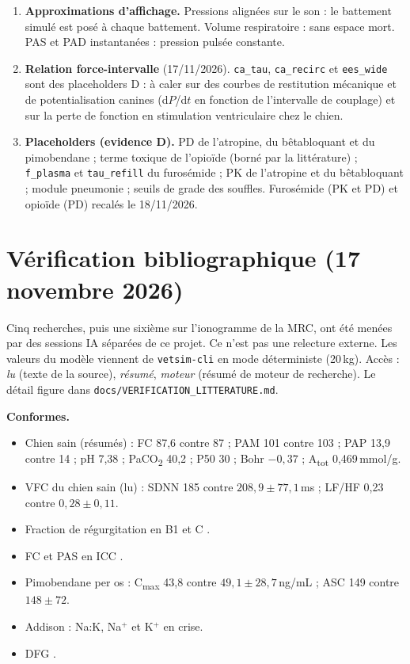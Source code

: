\documentclass[11pt,a4paper]{article}
\begin{document}
\begin{enumerate}
  \item \textbf{Approximations d'affichage.} Pressions alignées sur le son : le battement simulé est posé à chaque battement. Volume respiratoire : sans espace mort. PAS et PAD instantanées : pression pulsée constante.
  \item \textbf{Relation force-intervalle} (17/11/2026). \texttt{ca\_tau}, \texttt{ca\_recirc} et \texttt{ees\_wide} sont des placeholders D : à caler sur des courbes de restitution mécanique et de potentialisation canines (d$P$/d$t$ en fonction de l'intervalle de couplage) et sur la perte de fonction en stimulation ventriculaire chez le chien.
  \item \textbf{Placeholders (evidence D).} PD de l'atropine, du bêtabloquant et du pimobendane ; terme toxique de l'opioïde (borné par la littérature) ; \texttt{f\_plasma} et \texttt{tau\_refill} du furosémide ; PK de l'atropine et du bêtabloquant ; module pneumonie ; seuils de grade des souffles. Furosémide (PK et PD) et opioïde (PD) recalés le 18/11/2026.
\end{enumerate}

\section{Vérification bibliographique (17 novembre 2026)}\label{sec:verif}
Cinq recherches, puis une sixième sur l'ionogramme de la MRC, ont été menées par des sessions IA séparées de ce projet. Ce n'est pas une relecture externe. Les valeurs du modèle viennent de \texttt{vetsim-cli} en mode déterministe (20\,kg). Accès : \emph{lu} (texte de la source), \emph{résumé}, \emph{moteur} (résumé de moteur de recherche). Le détail figure dans \texttt{docs/VERIFICATION\_LITTERATURE.md}.

\textbf{Conformes.}
\begin{itemize}
  \item Chien sain \citep{haskins2005,cambier2004,constable2005} (résumés) : FC 87,6 contre 87 ; PAM 101 contre 103 ; PAP 13,9 contre 14 ; pH 7,38 ; PaCO\textsubscript{2} 40,2 ; P50 30 ; Bohr $-0{,}37$ ; A\textsubscript{tot} 0,469\,mmol/g.
  \item VFC du chien sain \citep{bogucki2015} (lu) : SDNN 185 contre $208{,}9\pm77{,}1$\,ms ; LF/HF 0,23 contre $0{,}28\pm0{,}11$.
  \item Fraction de régurgitation en B1 et C \citep{kawai2026}.
  \item FC et PAS en ICC \citep{yin2026}.
  \item Pimobendane per os \citep{her2020} : C\textsubscript{max} 43,8 contre $49{,}1\pm28{,}7$\,ng/mL ; ASC 149 contre $148\pm72$.
  \item Addison \citep{adler2007,baumstark2014,hall2023} : Na:K, Na$^+$ et K$^+$ en crise.
  \item DFG \citep{bexfield2008}.
\end{itemize}
\end{document}
